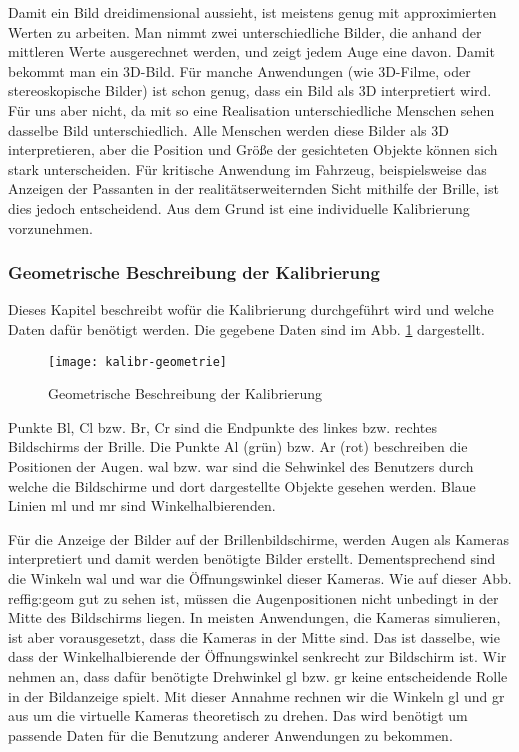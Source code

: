 Damit ein Bild dreidimensional aussieht, ist meistens genug mit approximierten Werten zu arbeiten.
Man nimmt zwei unterschiedliche Bilder, die anhand der mittleren Werte ausgerechnet werden, und zeigt jedem Auge eine davon. 
Damit bekommt man ein 3D-Bild. 
Für manche Anwendungen (wie 3D-Filme, oder stereoskopische Bilder) ist schon genug,  dass ein Bild als 3D interpretiert wird. 
Für uns aber nicht, da mit so eine Realisation unterschiedliche Menschen sehen dasselbe Bild unterschiedlich.
Alle Menschen werden diese Bilder als 3D interpretieren, aber die Position und Größe der gesichteten Objekte können sich stark unterscheiden. Für kritische Anwendung im Fahrzeug, beispielsweise das Anzeigen der Passanten in der realitätserweiternden Sicht mithilfe der Brille, ist dies jedoch entscheidend. Aus dem Grund ist eine individuelle Kalibrierung vorzunehmen.


\subsubsection{Geometrische Beschreibung der Kalibrierung}
Dieses Kapitel beschreibt wofür die Kalibrierung durchgeführt wird und welche Daten dafür benötigt werden.
Die gegebene Daten sind im Abb. \ref{fig:geom} dargestellt. 

\begin{figure}[h]
   \centering
   \texttt{[image: kalibr-geometrie]}
   \caption{Geometrische Beschreibung der Kalibrierung}
   \label{fig:geom}
\end{figure}

Punkte Bl, Cl bzw. Br, Cr sind die Endpunkte des linkes bzw. rechtes Bildschirms der Brille.
Die Punkte Al (grün) bzw. Ar (rot) beschreiben die Positionen der Augen.
wal bzw. war sind die Sehwinkel des Benutzers durch welche die Bildschirme und dort dargestellte Objekte gesehen werden. 
Blaue Linien ml und mr sind Winkelhalbierenden.

Für die Anzeige der Bilder auf der Brillenbildschirme, werden Augen als Kameras interpretiert und damit werden benötigte Bilder erstellt.
Dementsprechend sind die Winkeln wal und war die Öffnungswinkel dieser Kameras.
Wie auf dieser Abb. ref{fig:geom} gut zu sehen ist, müssen die Augenpositionen nicht unbedingt in der Mitte des Bildschirms liegen.
In meisten Anwendungen, die Kameras simulieren, ist aber vorausgesetzt, dass die Kameras in der Mitte sind.
Das ist dasselbe, wie dass der Winkelhalbierende der Öffnungswinkel senkrecht zur Bildschirm ist.
Wir nehmen an, dass dafür benötigte Drehwinkel gl bzw. gr keine entscheidende Rolle in der Bildanzeige spielt.
Mit dieser Annahme rechnen wir die Winkeln gl und gr aus  um die virtuelle Kameras theoretisch zu drehen.
Das wird benötigt um passende Daten für die Benutzung anderer Anwendungen zu bekommen.

